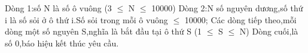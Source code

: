 Dòng 1:số N là số ô vuông (3 $\le$ N $\le$ 10000) Dòng 2:N số nguyên dương,số thứ i là số sỏi ở ô thứ i.Số sỏi trong mỗi ô vuông  $\le$ 10000; Các dòng tiếp theo,mỗi dòng một số nguyên S,nghĩa là bắt đầu tại ô thứ S (1 $\le$ S $\le$ N) Dòng cuối,là số 0,báo hiệu kết thúc yêu cầu.